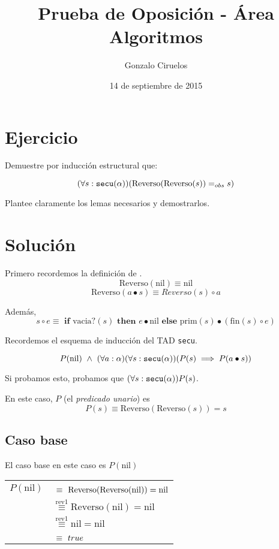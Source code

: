 \documentclass[hidelinks,a4paper,10pt, nofootinbib]{article}
\title{Prueba de Oposición - Área Algoritmos}
\author{Gonzalo Ciruelos}
\date{14 de septiembre de 2015}
\newcommand{\tx}[1]{\text{#1}}
\newcommand{\secu}{\ensuremath\texttt{secu}(\alpha)}
\newcommand{\rev}{\text{Reverso}}
\newcommand{\cons}{\bullet}
\newcommand{\snoc}{\circ}
\newcommand{\nil}{\text{nil}}
\newcommand{\prim}{\text{prim}}
\newcommand{\fin}{\text{fin}}
\newcommand{\por}[1]{\overset{\text{#1}}{\equiv}}
\begin{document}
\maketitle

\section*{Ejercicio}

Demuestre por inducción estructural que:

$$(\forall s : \secu)(\tx{Reverso}(\tx{Reverso}(s)) =_{obs} s)$$

Plantee claramente los lemas necesarios y demostrarlos.


\section*{Solución}

Primero recordemos la definición de \rev.
\[\rev(\nil) \equiv \nil \tag{rev1}\]
\[\rev(a \cons s) \equiv Reverso(s) \snoc a \tag{rev2}\]

Además,
\[s \circ e \equiv \textbf{ if } \text{vacia?}(s) \textbf{ then } e \cons \nil \textbf{ else } \prim(s) \cons (\fin(s) \circ e) \tag{snoc}\]

Recordemos el esquema de inducción del TAD \texttt{secu}.

$$P(\nil)\  \land \  (\forall a : \alpha) (\forall s : \secu) (P(s) \implies P(a \cons s))$$

Si probamos esto, probamos que $(\forall s : \secu) P(s)$.

En este caso, $P$  (el \emph{predicado unario}) es
$$ P(s) \equiv \rev(\rev(s)) = s$$



\subsection*{Caso base}
El caso base en este caso es $P(\nil)$

\begin{center}
\begin{tabular}{c l}
$P(\nil)$ & $\por{\phantom{rev1}} \rev(\rev(\nil)) = \nil$ \\
          & $\por{rev1} \rev(\nil) = \nil$ \\
          & $\por{rev1} \nil = \nil$  \\
          & $\por{\phantom{rev1}} true$ \\
\end{tabular}
\end{center}
\end{document}
